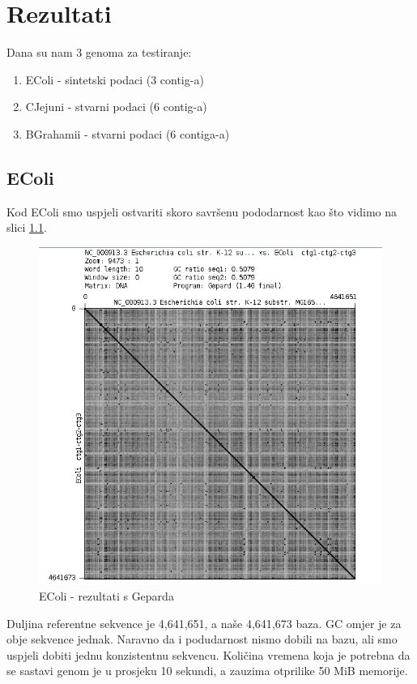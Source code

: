 \chapter{Rezultati}
Dana su nam 3 genoma za testiranje:
\begin{enumerate}
\item EColi - sintetski podaci (3 contig-a)
\item CJejuni - stvarni podaci (6 contig-a)
\item BGrahamii - stvarni podaci (6 contiga-a)
\end{enumerate}
\section{EColi}
Kod EColi smo uspjeli ostvariti skoro savršenu pododarnost kao što vidimo na slici \ref{fig:ecoli}.

\begin{figure}[H]
    \centering
    \includegraphics[scale=0.45]{img/EColi.png}
    \caption{EColi - rezultati s Geparda}
    \label{fig:ecoli}
\end{figure}

Duljina referentne sekvence je 4,641,651, a naše 4,641,673 baza. GC omjer je za obje sekvence jednak. Naravno da i podudarnost nismo dobili na bazu, ali smo uspjeli dobiti jednu konzistentnu sekvencu. Količina vremena koja je potrebna da se sastavi genom je u prosjeku 10 sekundi, a zauzima otprilike 50 MiB memorije.

